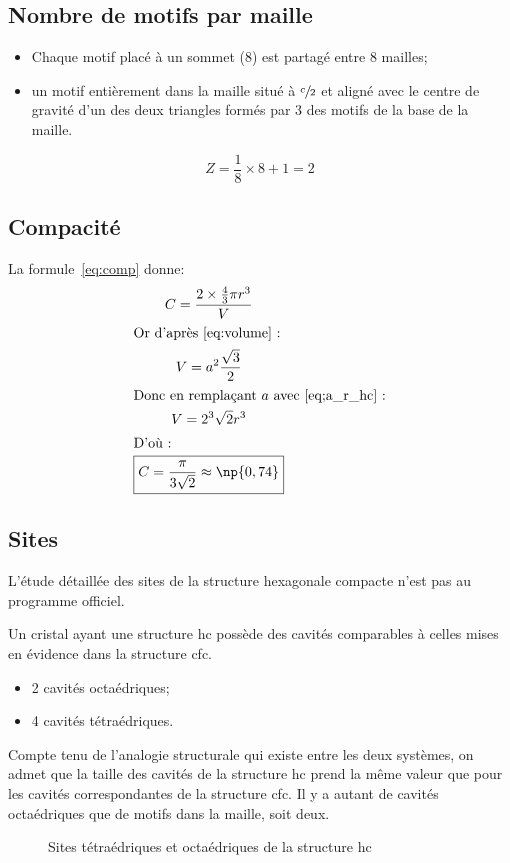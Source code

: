\subsection{Nombre de motifs par maille}
\begin{itemize}
    \item Chaque motif placé à un sommet (8) est partagé entre
        8 mailles;
    \item un motif entièrement dans la maille situé à
        $\sfrac{c}{2}$ et aligné avec le centre de gravité d'un
        des deux triangles formés par 3 des motifs de la base de
        la maille.
\end{itemize}
\begin{equation}
    Z = \frac{1}{8} \times 8 + 1 = 2
\end{equation}

\subsection{Compacité}
La formule~\ref{eq:comp} donne:
\begin{gather}
    C = \frac{2 \times \frac{4}{3}\pi r^3}{V}\\
    \intertext{Or d'après~\ref{eq:volume} :}
    V=a^2 \frac{\sqrt{3}}{2}\\
    \intertext{Donc en remplaçant $a$ avec~\ref{eq;a_r_hc} :}
    V=2^3\sqrt{2}r^3 \label{eq:V_hc}\\
    \intertext{D'où :}
    \boxed{C = \frac{\pi}{3\sqrt{2}} \approx \np{0,74}}
    \label{eq:comp_hc}
\end{gather}

\subsection{Sites}
\begin{rem}
    L'étude détaillée des sites de la structure hexagonale
    compacte n'est pas au programme officiel.
\end{rem}
Un cristal ayant une structure hc possède des cavités comparables
à celles mises en évidence dans la structure cfc.
\begin{itemize}
    \item 2 cavités octaédriques;
    \item 4 cavités tétraédriques.
\end{itemize}
Compte tenu de l’analogie structurale qui existe entre les deux
systèmes, on admet que la taille des cavités de la structure
hc prend la même valeur que pour les cavités correspondantes
de la structure cfc. Il y a autant de cavités octaédriques que
de motifs dans la maille, soit deux.
\begin{figure}
    \centering
    
    \caption{Sites tétraédriques et octaédriques
        de la structure hc}
\end{figure}


